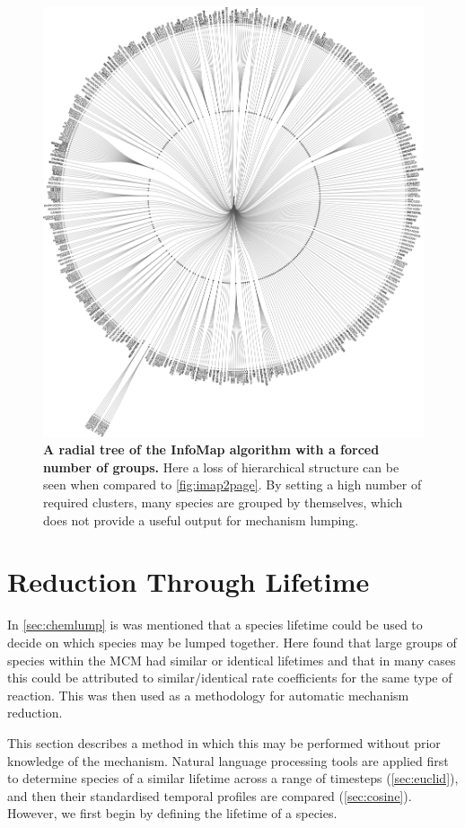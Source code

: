   \begin{figure}[H]
    \centering
    \includegraphics[width=.8\textwidth]{fig/manygroups.pdf}
    \caption{\textbf{A radial tree of the InfoMap algorithm with a forced number of groups.} Here a loss of hierarchical structure can be seen when compared to \autoref{fig:imap2page}. By setting a high number of required clusters, many species are grouped by themselves, which does not provide a useful output for mechanism lumping. }
        \label{fig:im200}
  \end{figure}






  \section{Reduction Through Lifetime}\label{sec:lifetime}
  In \autoref{sec:chemlump} is was mentioned that a species lifetime could be used to decide on which species may be lumped together. Here \cite{lifetime} found that large groups of species within the MCM had similar or identical lifetimes and that in many cases this could be attributed to similar/identical rate coefficients for the same type of reaction. This was then used as a methodology for automatic mechanism reduction.

  This section describes a method in which this may be performed without prior knowledge of the mechanism. Natural language processing tools are applied first to determine species of a similar lifetime across a range of timesteps (\autoref{sec:euclid}), and then their standardised temporal profiles are compared (\autoref{sec:cosine}). However, we first begin by defining the lifetime of a species.

